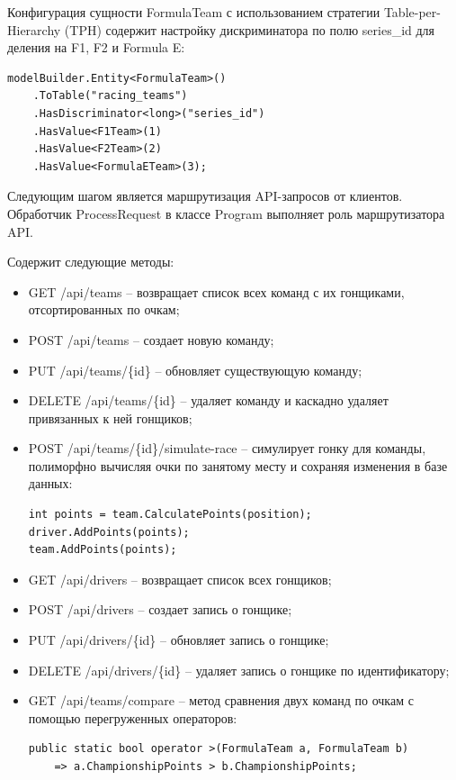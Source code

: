 \documentclass[oneside,a4paper,14pt]{extarticle}
\begin{document}
Конфигурация сущности FormulaTeam с использованием стратегии Table-per-Hierarchy (TPH) содержит настройку дискриминатора по полю series\_id для деления на F1, F2 и Formula E:
\begin{verbatim}
modelBuilder.Entity<FormulaTeam>()
    .ToTable("racing_teams")
    .HasDiscriminator<long>("series_id")
    .HasValue<F1Team>(1)
    .HasValue<F2Team>(2)
    .HasValue<FormulaETeam>(3);
\end{verbatim}

Следующим шагом является маршрутизация API-запросов от клиентов. Обработчик ProcessRequest в классе Program выполняет роль маршрутизатора API.

Содержит следующие методы:
\begin{itemize}
  \item[--] GET /api/teams -- возвращает список всех команд с их гонщиками, отсортированных по очкам;
  \item[--] POST /api/teams -- создает новую команду;
  \item[--] PUT /api/teams/\{id\} -- обновляет существующую команду;
  \item[--] DELETE /api/teams/\{id\} -- удаляет команду и каскадно удаляет привязанных к ней гонщиков;
  \item[--] POST /api/teams/\{id\}/simulate-race -- симулирует гонку для команды, полиморфно вычисляя очки по занятому месту и сохраняя изменения в базе данных:
        \begin{verbatim}
int points = team.CalculatePoints(position);
driver.AddPoints(points);
team.AddPoints(points);
\end{verbatim}
  \item[--] GET /api/drivers -- возвращает список всех гонщиков;
  \item[--] POST /api/drivers -- создает запись о гонщике;
  \item[--] PUT /api/drivers/\{id\} -- обновляет запись о гонщике;
  \item[--] DELETE /api/drivers/\{id\} -- удаляет запись о гонщике по идентификатору;
  \item[--] GET /api/teams/compare -- метод сравнения двух команд по очкам с помощью перегруженных операторов:
        \begin{verbatim}
public static bool operator >(FormulaTeam a, FormulaTeam b) 
    => a.ChampionshipPoints > b.ChampionshipPoints;
\end{verbatim}
\end{itemize}
\end{document}
